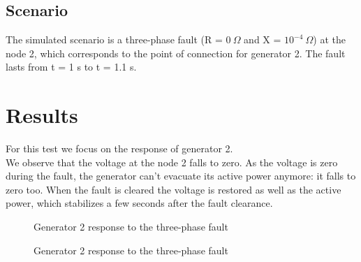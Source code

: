 \documentclass[a4paper, 12pt]{report}
\begin{document}
\subsection{Scenario}
The simulated scenario is a three-phase fault (R = $0 \ \Omega$ and X = $10^{-4} \ \Omega$) at the node 2, which corresponds to the point of connection for generator 2. The fault lasts from t = 1 s to t = 1.1 s.

\newpage
\section{Results}

For this test we focus on the response of generator 2.\\

We observe that the voltage at the node 2 falls to zero. As the voltage is zero during the fault, the generator can't evacuate its active power anymore: it falls to zero too. When the fault is cleared the voltage is restored as well as the active power, which stabilizes a few seconds after the fault clearance.\\

\begin{figure}[H]
\caption{Generator 2 response to the three-phase fault}
\end{figure}


\begin{figure}[H]
\caption{Generator 2 response to the three-phase fault}
\end{figure}
\end{document}
